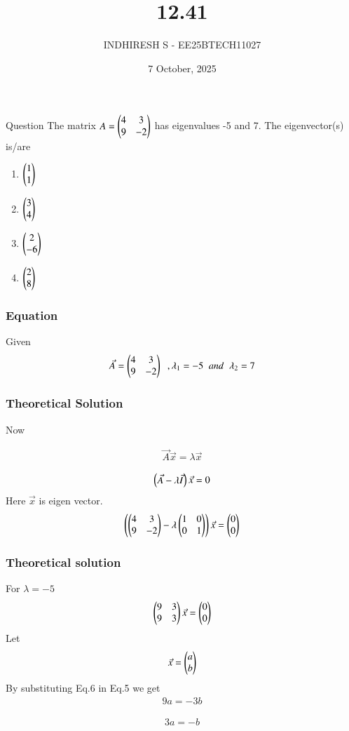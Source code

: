 \documentclass{beamer}
\title %
    {12.41}
\date{7 October, 2025}
\author %
    {INDHIRESH S - EE25BTECH11027}
\begin{document}
    
    \frame{\titlepage}
    
    \begin{frame}{Question}
   The matrix $A =\begin{pmatrix}4&3\\9&-2\end{pmatrix}$ has eigenvalues -5 and 7. The eigenvector(s) is/are
\begin{enumerate}
    \item $\begin{pmatrix}1\\1\end{pmatrix}$
    \item $\begin{pmatrix}3\\4\end{pmatrix}$
    \item $\begin{pmatrix}2\\-6\end{pmatrix}$
    \item $\begin{pmatrix}2\\8\end{pmatrix}$
\end{enumerate}
    \end{frame}
    
    \begin{frame}[allowframebreaks] 
    \frametitle{Equation}
        \centering
        \label{tab:parameters}
Given
\begin{align}
 \Vec{A} =\begin{pmatrix}4&3\\9&-2\end{pmatrix}\;\;,\lambda_1=-5\;\;and\;\;\lambda_2=7
\end{align}

    \end{frame}
    
    \begin{frame}
    \frametitle{Theoretical Solution}
   Now 

\begin{align}
  \Vec{A}\Vec{x}=\lambda\Vec{x}
\end{align}

\begin{align}
\begin{pmatrix}\Vec{A}-\lambda\Vec{I}\end{pmatrix}\Vec{x}=0
\end{align}
Here $\Vec{x}$ is eigen vector.
\begin{align}
\begin{pmatrix}\begin{pmatrix}4&3\\9&-2\end{pmatrix}-\lambda\begin{pmatrix}1&0\\0&1\end{pmatrix}\end{pmatrix}\Vec{x}=\begin{pmatrix}0\\0\end{pmatrix}
\end{align}



    \end{frame}
    
    \begin{frame}
    \frametitle{Theoretical solution}
 For  $\lambda=-5$
\begin{align}
 \begin{pmatrix}9&3\\9&3\end{pmatrix}\Vec{x}=\begin{pmatrix}0\\0\end{pmatrix}
\end{align}
Let 
\begin{align}
   \Vec{x}=\begin{pmatrix}a\\b\end{pmatrix}
\end{align}
By substituting Eq.6 in Eq.5 we get
\begin{align}
  9a=-3b
\end{align}

\begin{align}
  3a=-b
\end{align}


    \end{frame}
\end{document}
